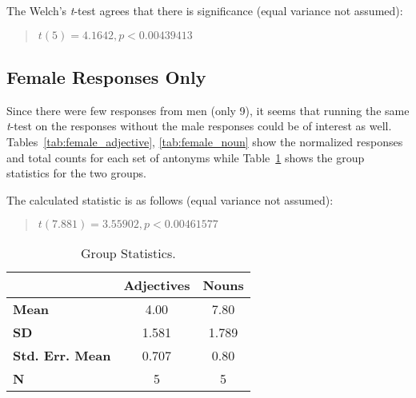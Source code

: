 The Welch's \textit{t}-test agrees that there is significance (equal variance not assumed):
	\begin{quote}
		$t(5)=4.1642, p < 0.00439413$
	\end{quote}


\subsection{Female Responses Only}
Since there were few responses from men (only 9), it seems that running the same \textit{t}-test on the responses without the male responses could be of interest as well.  Tables~\ref{tab:female_adjective}, \ref{tab:female_noun} show the normalized responses and total counts for each set of antonyms while Table~\ref{tab:female_group_stats} shows the group statistics for the two groups.





The calculated statistic is as follows (equal variance not assumed):
	\begin{quote}
		$t(7.881)=3.55902, p < 0.00461577$ 
	\end{quote}


\begin{table}
	\begin{center}
		\begin{tabular}{|l|c|c|} \hline
									& \textbf{Adjectives} 	& \textbf{Nouns}  \\ \hline \hline
			\textbf{Mean} 			& 4.00					& 7.80	\\
			\textbf{SD} 			& 1.581					& 1.789	\\
			\textbf{Std. Err. Mean} & 0.707					& 0.80	\\
			\textbf{N} 				& 5						& 5		\\
			\hline
		\end{tabular}
	\end{center}
	\caption {Group Statistics.}
	\label{tab:female_group_stats}
\end{table}




%
